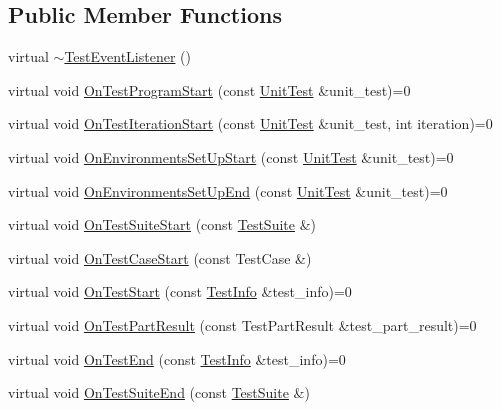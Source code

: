 \subsection*{Public Member Functions}
\begin{DoxyCompactItemize}
\item 
virtual \hyperlink{classtesting_1_1TestEventListener_a4512d19e7a108ec4926239ec1ea85d63}{$\sim$\+Test\+Event\+Listener} ()
\item 
virtual void \hyperlink{classtesting_1_1TestEventListener_a5f6c84f39851e8a603a2d2e10063816b}{On\+Test\+Program\+Start} (const \hyperlink{classtesting_1_1UnitTest}{Unit\+Test} \&unit\+\_\+test)=0
\item 
virtual void \hyperlink{classtesting_1_1TestEventListener_a60cc09b7907cb329d152eb5e7133bdeb}{On\+Test\+Iteration\+Start} (const \hyperlink{classtesting_1_1UnitTest}{Unit\+Test} \&unit\+\_\+test, int iteration)=0
\item 
virtual void \hyperlink{classtesting_1_1TestEventListener_aa6502e534919605be45f26a6daf9a40c}{On\+Environments\+Set\+Up\+Start} (const \hyperlink{classtesting_1_1UnitTest}{Unit\+Test} \&unit\+\_\+test)=0
\item 
virtual void \hyperlink{classtesting_1_1TestEventListener_aaa1021d75f5dbf3f05c829c1cc520341}{On\+Environments\+Set\+Up\+End} (const \hyperlink{classtesting_1_1UnitTest}{Unit\+Test} \&unit\+\_\+test)=0
\item 
virtual void \hyperlink{classtesting_1_1TestEventListener_a2726cc70dfda861f109355f1d9f09dfe}{On\+Test\+Suite\+Start} (const \hyperlink{classtesting_1_1TestSuite}{Test\+Suite} \&)
\item 
virtual void \hyperlink{classtesting_1_1TestEventListener_ac48628c9f78d3e10bff77c7366e9e780}{On\+Test\+Case\+Start} (const Test\+Case \&)
\item 
virtual void \hyperlink{classtesting_1_1TestEventListener_ab4f6a0ca16ae75daf385b3b5914e1048}{On\+Test\+Start} (const \hyperlink{classtesting_1_1TestInfo}{Test\+Info} \&test\+\_\+info)=0
\item 
virtual void \hyperlink{classtesting_1_1TestEventListener_a054f8705c883fa120b91473aff38f2ee}{On\+Test\+Part\+Result} (const Test\+Part\+Result \&test\+\_\+part\+\_\+result)=0
\item 
virtual void \hyperlink{classtesting_1_1TestEventListener_abb1c44525ef038500608b5dc2f17099b}{On\+Test\+End} (const \hyperlink{classtesting_1_1TestInfo}{Test\+Info} \&test\+\_\+info)=0
\item 
virtual void \hyperlink{classtesting_1_1TestEventListener_a8962caad5d2522c9160c794074a662ee}{On\+Test\+Suite\+End} (const \hyperlink{classtesting_1_1TestSuite}{Test\+Suite} \&)

\end{DoxyCompactItemize}
